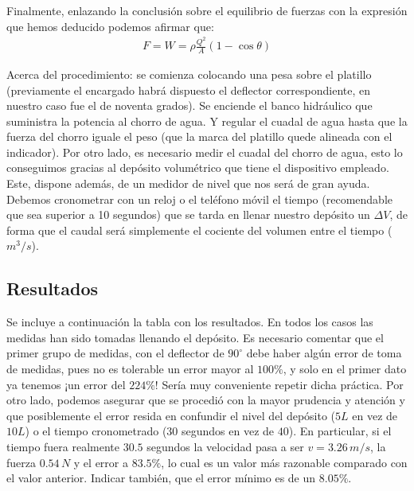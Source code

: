 \documentclass[12pt,a4paper]{article}
\newcommand{\grad}{^{\circ}}
\begin{document}
Finalmente, enlazando la conclusión sobre el equilibrio de fuerzas con la expresión que hemos deducido podemos afirmar que:
\begin{align*}
F=W=\rho \frac{Q^{2}}{A}(1-\cos\theta)
\end{align*}

Acerca del procedimiento: se comienza colocando una pesa sobre el platillo (previamente el encargado habrá dispuesto el deflector correspondiente, en nuestro caso fue el de noventa grados). Se enciende el banco hidráulico que suministra la potencia al chorro de agua. Y regular el cuadal de agua hasta que la fuerza del chorro iguale el peso (que la marca del platillo quede alineada con el indicador). Por otro lado, es necesario medir el cuadal del chorro de agua, esto lo conseguimos gracias al depósito volumétrico que tiene el dispositivo empleado. Este, dispone además, de un medidor de nivel que nos será de gran ayuda. Debemos cronometrar con un reloj o el teléfono móvil el tiempo (recomendable que sea superior a 10 segundos) que se tarda en llenar nuestro depósito un $\Delta V$, de forma que el caudal será simplemente el cociente del volumen entre el tiempo ($m^3/s$).

\subsection*{Resultados}

Se incluye a continuación la tabla con los resultados. En todos los casos las medidas han sido tomadas llenando el depósito. Es necesario comentar que el primer grupo de medidas, con el deflector de $90\grad$ debe haber algún error de toma de medidas, pues no es tolerable un error mayor al $100\%$, y solo en el primer dato ya tenemos ¡un error del $224\%$! Sería muy conveniente repetir dicha práctica. Por otro lado, podemos asegurar que se procedió con la mayor prudencia y atención y que posiblemente el error resida en confundir el nivel del depósito ($5L$ en vez de $10L$) o el tiempo cronometrado ($30$ segundos en vez de $40$). En particular, si el tiempo fuera realmente $30.5$ segundos la velocidad pasa a ser $v=3.26\,m/s$, la fuerza $0.54\,N$ y el error a $83.5\%$, lo cual es un valor más razonable comparado con el valor anterior. Indicar también, que el error mínimo es de un $8.05\%$.
\end{document}
